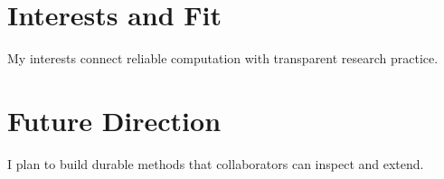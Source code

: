 \documentclass[medium=print]{careerdossier-statement}
\begin{document}
\MakeCDossierStatementHeader

\section*{Interests and Fit}

My interests connect reliable computation with transparent research practice.

\newpage

\section*{Future Direction}

I plan to build durable methods that collaborators can inspect and extend.
\end{document}
